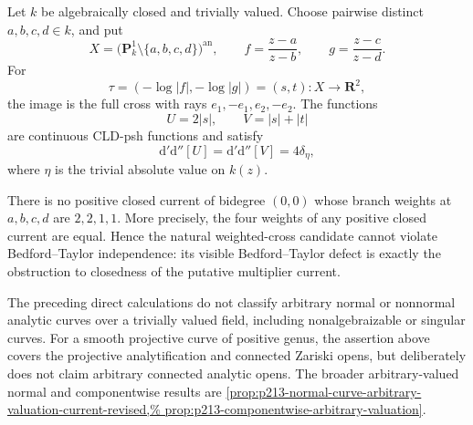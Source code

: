 \begin{proposition}
\label{prop:p213-triv-four-puncture-no-go}
Let $k$ be algebraically closed and trivially valued.  Choose pairwise
distinct $a,b,c,d\in k$, and put
\[
 X=\bigl(\mathbf P^1_k\setminus\{a,b,c,d\}\bigr)^{\mathrm{an}},
 \qquad
 f=\frac{z-a}{z-b},\qquad g=\frac{z-c}{z-d}.
\]
For
\[
 \tau=(-\log|f|,-\log|g|)=(s,t):X\longrightarrow\mathbf R^2,
\]
the image is the full cross with rays $e_1,-e_1,e_2,-e_2$.  The functions
\begin{equation}
                 U=2|s|,
       \qquad    V=|s|+|t|
\label{eq:p213-triv-cross-potentials}
\end{equation}
are continuous CLD-psh functions and satisfy
\begin{equation}
                 \mathrm d'\mathrm d''[U]
                  =\mathrm d'\mathrm d''[V]
                  =4\delta_\eta,
\label{eq:p213-triv-cross-curvature}
\end{equation}
where $\eta$ is the trivial absolute value on $k(z)$.

There is no positive closed current of bidegree $(0,0)$ whose branch
weights at $a,b,c,d$ are $2,2,1,1$.  More precisely, the four weights of
any positive closed current are equal.  Hence the natural weighted-cross
candidate cannot violate Bedford--Taylor independence: its visible
Bedford--Taylor defect is exactly the obstruction to closedness of the
putative multiplier current.
\end{proposition}

\begin{remark}
\label{rem:p213-triv-quarantine-scope}
The preceding direct calculations do not classify arbitrary
normal or nonnormal analytic curves over a trivially valued field, including
nonalgebraizable or singular curves.  For a smooth projective curve of
positive genus, the assertion above covers the projective analytification
and connected Zariski opens, but deliberately does not claim arbitrary
connected analytic opens.  The broader arbitrary-valued normal and
componentwise results are
\cref{prop:p213-normal-curve-arbitrary-valuation-current-revised,%
prop:p213-componentwise-arbitrary-valuation}.
\end{remark}
